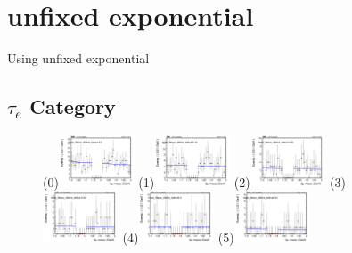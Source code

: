 \section{unfixed exponential}
\label{sec:unfixed_exp}

Using unfixed exponential

\subsection{$\tau_{e}$ Category}
\label{sec:taue}

\begin{figure}[h!]
        \centering
        \subfigure(0){\includegraphics[width=0.2\textwidth]{unfixed_exp/plots/taue/massfit_taue_40bins_bdtcut-0.2.png}}
        \subfigure(1){\includegraphics[width=0.2\textwidth]{unfixed_exp/plots/taue/massfit_taue_40bins_bdtcut-0.14.png}}
        \subfigure(2){\includegraphics[width=0.2\textwidth]{unfixed_exp/plots/taue/massfit_taue_40bins_bdtcut-0.08.png}}
        \subfigure(3){\includegraphics[width=0.2\textwidth]{unfixed_exp/plots/taue/massfit_taue_40bins_bdtcut-0.02.png}}
        \subfigure(4){\includegraphics[width=0.2\textwidth]{unfixed_exp/plots/taue/massfit_taue_40bins_bdtcut0.0.png}}
        \subfigure(5){\includegraphics[width=0.2\textwidth]{unfixed_exp/plots/taue/massfit_taue_40bins_bdtcut0.04.png}}

\end{figure}
